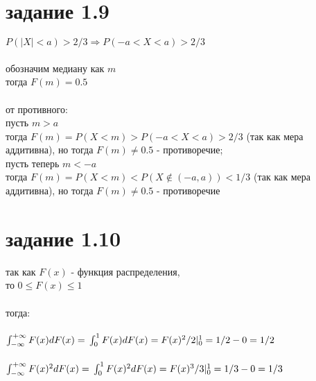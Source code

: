 \documentclass[a4paper]{article}
\begin{document}
	\section*{задание 1.9}
	\begin{large}
	$P(|X|<a)>2/3 \Rightarrow P(-a<X<a)>2/3$\\
	\\
	обозначим медиану как $m$\\
	тогда $F(m) = 0.5$\\
	\\
	от противного:\\
	пусть $m>a$\\
	тогда $F(m)=P(X<m)>P(-a<X<a)>2/3$ (так как мера аддитивна), но тогда $F(m) \ne 0.5$ - противоречие;\\
	пусть теперь $m<-a$\\
	тогда $F(m)=P(X<m)<P(X \notin (-a, a))<1/3$ (так как мера аддитивна), но тогда $F(m) \ne 0.5$ - противоречие\\
	\section*{задание 1.10}
	так как $F(x)$ - функция распределения,\\
	то $0 \le F(x) \le 1$\\
	\\
	тогда:\\
	\\
	$\int_{-\infty}^{+\infty} F(x) dF(x) =\\
	\\
	\int_{0}^{1} F(x) dF(x) = F(x)^{2}/2|_0^{1} = 1/2 - 0 = 1/2$\\
	\\
	$\int_{-\infty}^{+\infty} F(x)^2 dF(x) =\\
	\\
	\int_{0}^{1} F(x)^2 dF(x) = F(x)^{3}/3|_0^{1} = 1/3 - 0 = 1/3$
\end{large}
\end{document}

